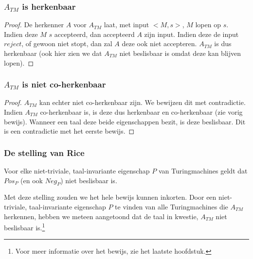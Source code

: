 \subsubsection*{$A_{TM}$ is herkenbaar}
\begin{proof}
	De herkenner $A$ voor $A_{TM}$ laat, met input $<M,s>$, $M$ lopen op $s$. Indien deze $M$ $s$ accepteerd, dan accepteerd $A$ zijn input. Indien deze de input $reject$, of gewoon niet stopt, dan zal $A$ deze ook niet accepteren. $A_{TM}$ is dus herkenbaar (ook hier zien we dat $A_{TM}$ niet beslisbaar is omdat deze kan blijven lopen).
\end{proof}

\subsubsection*{$A_{TM}$ is niet co-herkenbaar}
\begin{proof}
	$A_{TM}$ kan echter niet co-herkenbaar zijn. We bewijzen dit met contradictie. Indien $A_{TM}$ co-herkenbaar is, is deze dus herkenbaar en co-herkenbaar (zie vorig bewijs). Wanneer een taal deze beide eigenschappen bezit, is deze beslisbaar. Dit is een contradictie met het eerste bewijs.
\end{proof}

\subsubsection*{De stelling van Rice}

\begin{theorem}
	Voor elke niet-triviale, taal-invariante eigenschap $P$ van Turingmachines geldt dat $Pos_P$ (en ook $Neg_P$) niet beslisbaar is.
\end{theorem}

Met deze stelling zouden we het hele bewijs kunnen inkorten. Door een niet-triviale, taal-invariante eigenschap $P$ te vinden van alle Turingmachines die $A_{TM}$ herkennen, hebben we meteen aangetoond dat de taal in kwestie, $A_{TM}$ niet beslisbaar is.\footnote{Voor meer informatie over het bewijs, zie het laatste hoofdstuk.}